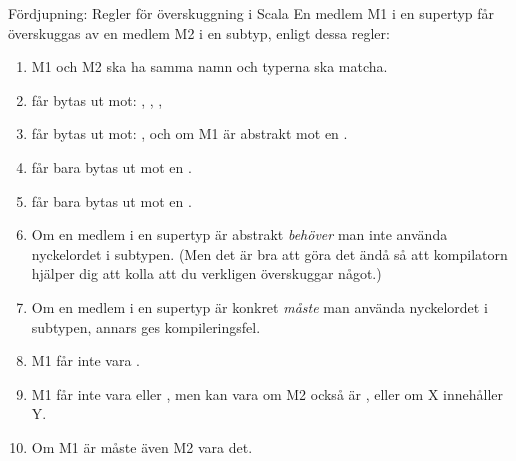 \begin{Slide}{Fördjupning: Regler för överskuggning i Scala} \SlideFontTiny
\label{slideW07:overriderules}
En medlem M1 i en supertyp får överskuggas av en medlem M2 i en subtyp, enligt dessa regler:
\begin{enumerate}
\item M1 och M2 ska ha samma namn och typerna ska matcha.
\item {} får bytas ut mot: , , , 
\item {} får bytas ut mot: , och om M1 är abstrakt mot en .
\item {} får bara bytas ut mot en .
\item {} får bara bytas ut mot en .
\item Om en medlem i en supertyp är abstrakt \emph{behöver} man inte använda nyckelordet  i subtypen. (Men det är bra att göra det ändå så att kompilatorn hjälper dig att kolla att du verkligen överskuggar något.)
\item Om en medlem i en supertyp är konkret \emph{måste} man använda nyckelordet  i subtypen, annars ges kompileringsfel.
\item M1 får inte vara .
\item M1 får inte vara  eller , men kan vara  om M2 också är , eller  om X innehåller Y.
\item Om M1 är  måste även M2 vara det.

\end{enumerate}
\end{Slide}



